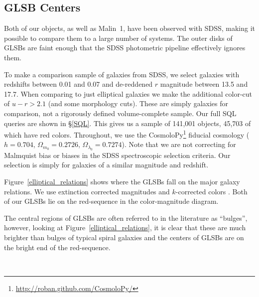 \documentclass{emulateapj}
\begin{document}
\subsection{GLSB Centers}\label{sec:centers}

Both of our objects, as well as Malin~1, have been observed with SDSS, making it possible to compare them to a large number of systems.  The outer disks of GLSBs are faint enough that the SDSS photometric pipeline effectively ignores them.  

To make a comparison sample of galaxies from SDSS, we select galaxies with redshifts between 0.01 and 0.07 and de-reddened $r$ magnitude between 13.5 and 17.7.  When comparing to just elliptical galaxies we make the additional color-cut of $u-r > 2.1$ (and some morphology cuts).  These are simply galaxies for comparison, not a rigorously defined volume-complete sample.  Our full SQL queries are shown in \S\ref{SQL}.  This gives us a sample of 141,001 objects, 45,703 of which have red colors.  Throughout, we use the CosmoloPy\footnote{\url{http://roban.github.com/CosmoloPy/}} fiducial cosmology ($h=0.704$, $\Omega_{m_0}=0.2726$, $\Omega_{\lambda_0}=0.7274$).  Note that we are not correcting for Malmquist bias or biases in the SDSS spectroscopic selection criteria.  Our selection is simply for galaxies of a similar magnitude and redshift.  


Figure~\ref{elliptical_relations} shows where the GLSBs fall on the major galaxy relations.  We use extinction corrected magnitudes and $k$-corrected colors \citep{Chilingarian10}.  Both of our GLSBs lie on the red-sequence in the color-magnitude diagram.  

The central regions of GLSBs are often referred to in the literature as ``bulges'', however, looking at Figure~\ref{elliptical_relations}, it is clear that these are much brighter than bulges of typical spiral galaxies and the centers of GLSBs are on the bright end of the red-sequence.  

\begin{figure*}
\\
\caption{
Top Left:  The color-magnitude diagram for 141,000 galaxies of similar redshift and magnitude as Malin~2 and UGC~6614.  Top Right:  The Faber-Jackson relation for 45,700 SDSS galaxies, along with a best-fit line.  Left:  The $r$-band fundamental plane from SDSS along with our GLSB galaxies and best-fit line.  Bottom Right:  The relation between central velocity dispersion and the Mg2 absorption feature.   From the point of view of the SDSS data reduction pipeline, GLSB galaxies appear as relatively normal red elliptical galaxies.  \label{elliptical_relations}}
\end{figure*}
\end{document}
